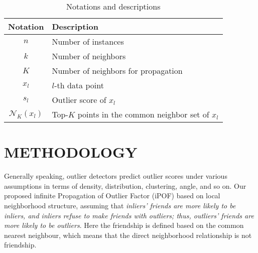 \documentclass[sigconf,nonacm]{acmart}
\begin{document}
\begin{table}[!t]
\small
\caption{Notations and descriptions}
\vspace{-4mm}
\centering
\begin{tabular}{c| l} \hline
Notation &   Description \\ \hline 
$n$ & Number of instances \\
$k$ & Number of neighbors \\
$K$ & Number of neighbors for propagation\\
$x_l$ & $l$-th data point\\
$s_l$ & Outlier score of $x_l$\\
$\mathcal{N}_K(x_l)$ &  Top-$K$ points in the common neighbor set of $x_l$\\
\hline
\end{tabular}\vspace{-4mm}
\label{tab:notation}
\end{table}

\section{METHODOLOGY}\label{sec:method}
Generally speaking, outlier detectors predict outlier scores under various assumptions in terms of density, distribution, clustering, angle, and so on. Our proposed infinite Propagation of Outlier Factor (iPOF) based on local neighborhood structure, assuming that \textit{inliers' friends are more likely to be inliers, and inliers refuse to make friends with outliers; thus, outliers' friends are more likely to be outliers}. Here the friendship is defined based on the common nearest neighbour, which means that the direct neighborhood relationship is not friendship. 
\end{document}
